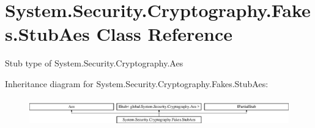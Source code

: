 \hypertarget{class_system_1_1_security_1_1_cryptography_1_1_fakes_1_1_stub_aes}{\section{System.\-Security.\-Cryptography.\-Fakes.\-Stub\-Aes Class Reference}
\label{class_system_1_1_security_1_1_cryptography_1_1_fakes_1_1_stub_aes}
}


Stub type of System.\-Security.\-Cryptography.\-Aes 


Inheritance diagram for System.\-Security.\-Cryptography.\-Fakes.\-Stub\-Aes\-:\begin{figure}[H]
\begin{center}
\leavevmode
\includegraphics[height=1.208199cm]{class_system_1_1_security_1_1_cryptography_1_1_fakes_1_1_stub_aes}
\end{center}
\end{figure}

